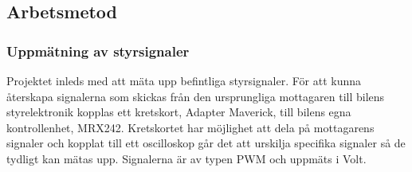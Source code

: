 \documentclass[a4paper]{article}
\begin{document}

\subsection{Arbetsmetod}
\subsubsection{Uppmätning av styrsignaler}
Projektet inleds med att mäta upp befintliga styrsignaler. För att kunna återskapa signalerna som skickas från den ursprungliga mottagaren till bilens styrelektronik kopplas ett kretskort, Adapter Maverick, till bilens egna kontrollenhet, MRX242. Kretskortet har möjlighet att dela på mottagarens signaler och kopplat till ett oscilloskop går det att urskilja specifika signaler så de tydligt kan mätas upp. Signalerna är av typen PWM och uppmäts i Volt. 
\end{document}
